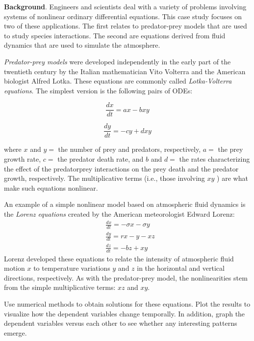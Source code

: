\documentclass[../main.tex]{subfiles}
\begin{document}
\noindent\textbf{Background}. Engineers and scientists deal with a variety of problems involving systems of nonlinear ordinary differential equations. This case study focuses on two of these
applications. The first relates to predator-prey models that are used to study species interactions. The second are equations derived from fluid dynamics that are used to simulate the
atmosphere.

\textit{Predator-prey models} were developed independently in the early part of the twentieth
century by the Italian mathematician Vito Volterra and the American biologist Alfred
Lotka. These equations are commonly called \textit{Lotka-Volterra equations}. The simplest version is the following pairs of ODEs:

\begin{equation}
    \tag{22.49}
    \frac{dx}{dt}=ax-bxy
\end{equation}

\begin{equation}
    \tag{22.50}
    \frac{dy}{dt}=-cy+dxy
\end{equation}

\noindent where $x$ and $y=$ the number of prey and predators, respectively, $a=$ the prey growth rate, $c=$ the predator death rate, and $b$ and $d=$ the rates characterizing the effect of the predatorprey interactions on the prey death and the predator growth, respectively. The multiplicative terms (i.e., those involving $x y$ ) are what make such equations nonlinear.

An example of a simple nonlinear model based on atmospheric fluid dynamics is the \textit{Lorenz equations} created by the American meteorologist Edward Lorenz:
$$
\begin{aligned}
&\frac{d x}{d t}=-\sigma x-\sigma y \\
&\frac{d y}{d t}=r x-y-x z \\
&\frac{d z}{d t}=-b z+x y
\end{aligned}
$$
Lorenz developed these equations to relate the intensity of atmospheric fluid motion $x$ to temperature variations $y$ and $z$ in the horizontal and vertical directions, respectively. As with the predator-prey model, the nonlinearities stem from the simple multiplicative terms: $xz$ and $xy$.

Use numerical methods to obtain solutions for these equations. Plot the results to visualize how the dependent variables change temporally. In addition, graph the dependent variables versus each other to see whether any interesting patterns emerge.
\end{document}
